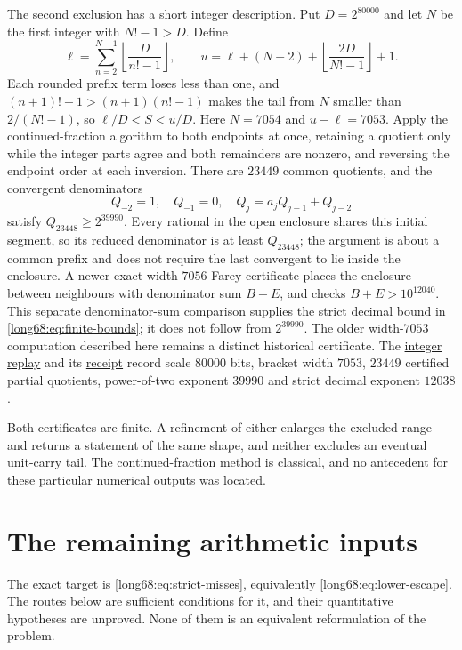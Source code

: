 \documentclass[11pt]{article}
\newcommand{\Ser}{S}
\begin{document}
The second exclusion has a short integer description.  Put $D=2^{80000}$ and
let $N$ be the first integer with $N!-1>D$.  Define
\[
 \ell=\sum_{n=2}^{N-1}\left\lfloor\frac D{n!-1}\right\rfloor,
 \qquad
 u=\ell+(N-2)+\left\lfloor\frac{2D}{N!-1}\right\rfloor+1 .
\]
Each rounded prefix term loses less than one, and $(n+1)!-1>(n+1)(n!-1)$
makes the tail from $N$ smaller than $2/(N!-1)$, so $\ell/D<\Ser<u/D$.  Here
$N=7054$ and $u-\ell=7053$.  Apply the continued-fraction algorithm to both
endpoints at once, retaining a quotient only while the integer parts agree
and both remainders are nonzero, and reversing the endpoint order at each
inversion.  There are $23449$ common quotients, and the convergent
denominators
\[
 Q_{-2}=1,\quad Q_{-1}=0,\quad Q_j=a_jQ_{j-1}+Q_{j-2}
\]
satisfy $Q_{23448}\ge2^{39990}$.  Every rational in the open enclosure shares
this initial segment, so its reduced denominator is at least $Q_{23448}$; the
argument is about a common prefix and does not require the last convergent to
lie inside the enclosure.  A newer exact width-$7056$ Farey certificate places
the enclosure between neighbours with denominator sum $B+E$, and checks
$B+E>10^{12040}$.  This separate denominator-sum comparison supplies the
strict decimal bound in \eqref{long68:eq:finite-bounds}; it does not follow
from $2^{39990}$.  The older width-$7053$ computation described here remains
a distinct historical certificate.  The
\href{https://github.com/wcook04/plectis-erdos/blob/cd3bd6fe245867a435e15d503ccedd699c5d02e2/scripts/check_erdos68_continued_fraction.py}{integer
replay} and its
\href{https://github.com/wcook04/plectis-erdos/blob/cd3bd6fe245867a435e15d503ccedd699c5d02e2/verification/erdos68-continued-fraction.json}{receipt}
record scale $80000$ bits, bracket width $7053$, $23449$ certified partial
quotients, power-of-two exponent $39990$ and strict decimal exponent $12038$.

Both certificates are finite.  A refinement of either enlarges the excluded
range and returns a statement of the same shape, and neither excludes an
eventual unit-carry tail.  The continued-fraction method is classical, and no
antecedent for these particular numerical outputs was located.

\section{The remaining arithmetic inputs}\label{long68:sec:open}

The exact target is \eqref{long68:eq:strict-misses}, equivalently
\eqref{long68:eq:lower-escape}.  The routes below are sufficient conditions for it,
and their quantitative hypotheses are unproved.  None of them is an
equivalent reformulation of the problem.
\end{document}
